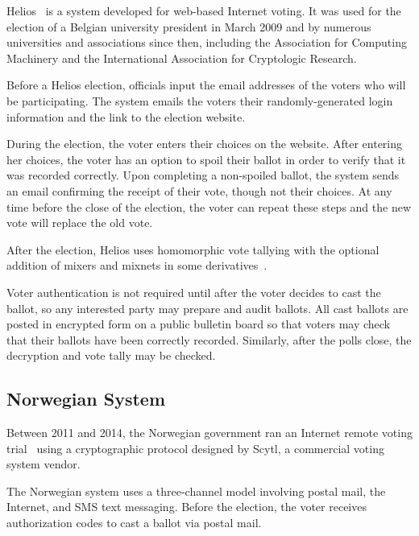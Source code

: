 Helios~\cite{adida2008,adida2009} is a system developed for web-based
Internet voting. It was used for the election of a Belgian university
president in March 2009 and by numerous universities and associations
since then, including the Association for Computing Machinery and the
International Association for Cryptologic Research.

Before a Helios election, officials input the email addresses of the
voters who will be participating. The system emails the voters their
randomly-generated login information and the link to the election
website.

During the election, the voter enters their choices on the
website. After entering her choices, the voter has an option to spoil
their ballot in order to verify that it was recorded correctly. Upon
completing a non-spoiled ballot, the system sends an email confirming
the receipt of their vote, though not their choices. At any time
before the close of the election, the voter can repeat these steps and
the new vote will replace the old vote.

After the election, Helios uses homomorphic vote tallying with the
optional addition of mixers and mixnets in some
derivatives~\cite{bulens2011,tsoukalas2013}.

Voter authentication is not required until after the voter decides to
cast the ballot, so any interested party may prepare and audit
ballots. All cast ballots are posted in encrypted form on a public
bulletin board so that voters may check that their ballots have been
correctly recorded. Similarly, after the polls close, the decryption
and vote tally may be checked.

\subsection{Norwegian System}

Between 2011 and 2014, the Norwegian government ran an Internet remote
voting trial~\cite{gjosteen2012} using a cryptographic protocol
designed by Scytl, a commercial voting system vendor. 

The Norwegian system uses a three-channel model involving postal mail,
the Internet, and SMS text messaging. Before the election, the voter
receives authorization codes to cast a ballot via postal mail.

